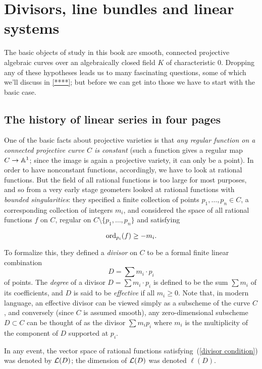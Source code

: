 \section{Divisors, line bundles and linear systems}


The basic objects of study in this book are smooth, connected projective algebraic curves over an algebraically closed field $K$ of characteristic 0. Dropping any of these hypotheses leads us to many fascinating questions, some of which we'll discuss in \ref{****}; but before we can get into those we have to start with the basic case.


\subsection{The history of linear series in four pages}

One of the basic facts about projective varieties is that \emph{any regular function on a connected projective curve $C$ is constant} (such a function gives a regular map $C \to \AA^1$; since the image is again a projective variety, it can only be a point).  In order to have nonconstant functions, accordingly, we have to look at rational functions. But the field of all rational functions is too large for most purposes, and so from a very early stage geometers looked at rational functions with \emph{bounded singularities}: they specified a finite collection of points $p_1,\dots,p_n \in C$, a corresponding collection of integers $m_i$, and considered the space of all rational functions $f$ on $C$, regular on $C \setminus \{p_1,\dots,p_n\}$  and satisfying

\begin{equation}\label{divisor condition}
\ord_{p_i}(f) \geq -m_i.
\end{equation}

To formalize this, they defined a \emph{divisor} on $C$ to be a formal finite linear combination
$$
D = \sum m_i \cdot p_i
$$
of points. The \emph{degree} of a divisor $D = \sum m_i \cdot p_i$ is defined to be the sum $\sum m_i$ of its coefficients, and $D$ is said to be \emph{effective} if all $m_i \geq 0$. Note that, in modern language, an effective divisor can be viewed simply as a subscheme of the curve $C$, and conversely (since $C$ is assumed smooth), any zero-dimensional subscheme $D \subset C$ can be thought of as the divisor $\sum m_ip_i$ where $m_i$ is the multiplicity of the component of $D$ supported at $p_i$.

In any event, the vector space of rational functions satisfying~(\ref{divisor condition}) was denoted by $\cL(D)$; the dimension of $\cL(D)$ was denoted $\ell(D)$.


